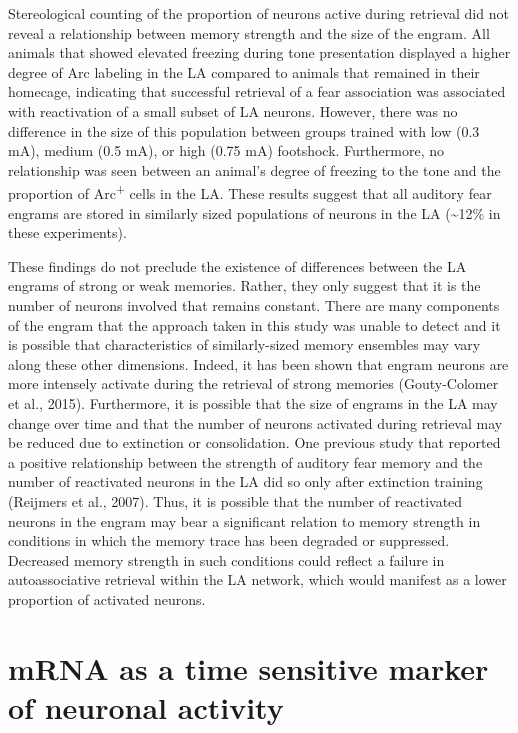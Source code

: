 \documentclass[12pt,a4paper,]{report}
\begin{document}
Stereological counting of the proportion of neurons active during
retrieval did not reveal a relationship between memory strength and the
size of the engram. All animals that showed elevated freezing during
tone presentation displayed a higher degree of Arc labeling in the LA
compared to animals that remained in their homecage, indicating that
successful retrieval of a fear association was associated with
reactivation of a small subset of LA neurons. However, there was no
difference in the size of this population between groups trained with
low (0.3 mA), medium (0.5 mA), or high (0.75 mA) footshock. Furthermore,
no relationship was seen between an animal's degree of freezing to the
tone and the proportion of Arc\textsuperscript{+} cells in the LA. These
results suggest that all auditory fear engrams are stored in similarly
sized populations of neurons in the LA (\textasciitilde{}12\% in these
experiments).

These findings do not preclude the existence of differences between the
LA engrams of strong or weak memories. Rather, they only suggest that it
is the number of neurons involved that remains constant. There are many
components of the engram that the approach taken in this study was
unable to detect and it is possible that characteristics of
similarly-sized memory ensembles may vary along these other dimensions.
Indeed, it has been shown that engram neurons are more intensely
activate during the retrieval of strong memories (Gouty-Colomer et al.,
2015). Furthermore, it is possible that the size of engrams in the LA
may change over time and that the number of neurons activated during
retrieval may be reduced due to extinction or consolidation. One
previous study that reported a positive relationship between the
strength of auditory fear memory and the number of reactivated neurons
in the LA did so only after extinction training (Reijmers et al., 2007).
Thus, it is possible that the number of reactivated neurons in the
engram may bear a significant relation to memory strength in conditions
in which the memory trace has been degraded or suppressed. Decreased
memory strength in such conditions could reflect a failure in
autoassociative retrieval within the LA network, which would manifest as
a lower proportion of activated neurons.

\section{mRNA as a time sensitive marker of neuronal
activity}\label{mrna-as-a-time-sensitive-marker-of-neuronal-activity}
\end{document}
